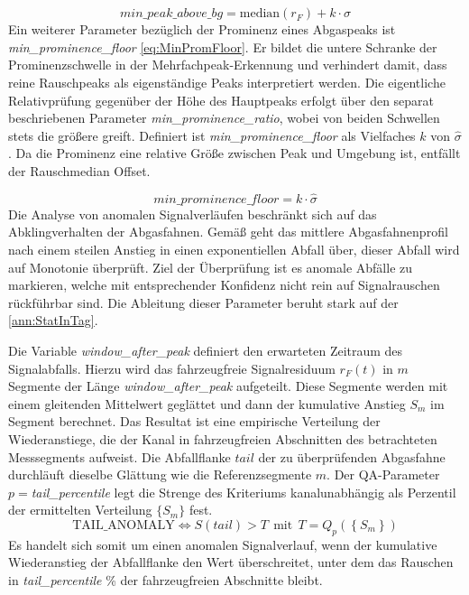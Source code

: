 \begin{equation}
min\_peak\_above\_bg = \mathrm{median}(r_F) + k \cdot \widehat{\sigma}
\label{eq:MinPeakAbovBg}
\end{equation}
\noindent
Ein weiterer Parameter bezüglich der Prominenz eines Abgaspeaks ist \textit{min\_prominence\_floor} \eqref{eq:MinPromFloor}. Er bildet die untere Schranke der Prominenzschwelle in der Mehrfachpeak-Erkennung und verhindert damit, dass reine Rauschpeaks als eigenständige Peaks interpretiert werden. Die eigentliche Relativprüfung gegenüber der Höhe des Hauptpeaks erfolgt über den separat beschriebenen Parameter \textit{min\_prominence\_ratio}, wobei von beiden Schwellen stets die größere greift. Definiert ist \textit{min\_prominence\_floor} als Vielfaches $k$ von $\widehat{\sigma}$. Da die Prominenz eine relative Größe zwischen Peak und Umgebung ist, entfällt der Rauschmedian Offset.

\begin{equation}
min\_prominence\_floor = k \cdot \widehat{\sigma}
\label{eq:MinPromFloor}
\end{equation}
\noindent
Die Analyse von anomalen Signalverläufen beschränkt sich auf das Abklingverhalten der Abgasfahnen. Gemäß \cite[S. 11700]{farrenHighlyDisaggregatedParticulate2025} geht das mittlere Abgasfahnenprofil nach einem steilen Anstieg in einen exponentiellen Abfall über, dieser Abfall wird auf Monotonie überprüft. Ziel der Überprüfung ist es anomale Abfälle zu markieren, welche mit entsprechender Konfidenz nicht rein auf Signalrauschen rückführbar sind. Die Ableitung dieser Parameter beruht stark auf der \autoref{ann:StatInTag}.


Die Variable \textit{window\_after\_peak} definiert den erwarteten Zeitraum des Signalabfalls. Hierzu wird das fahrzeugfreie Signalresiduum $r_F(t)$ in $m$ Segmente der Länge \textit{window\_after\_peak} aufgeteilt. Diese Segmente werden mit einem gleitenden Mittelwert \cite[vgl.][S. 567]{fahrmeirStatistikWegZur2024} geglättet und dann der kumulative Anstieg $S_m$ im Segment berechnet. Das Resultat ist eine empirische Verteilung der Wiederanstiege, die der Kanal in fahrzeugfreien Abschnitten des betrachteten Messsegments aufweist. Die Abfallflanke $tail$ der zu überprüfenden Abgasfahne durchläuft dieselbe Glättung wie die Referenzsegmente $m$. \vspace{1em}
\noindent
Der QA-Parameter $p=$\textit{tail\_percentile} legt die Strenge des Kriteriums kanalunabhängig als Perzentil der ermittelten Verteilung $\{S_m\}$ fest.
\begin{equation}
    \mathrm{TAIL\_ANOMALY} \iff S(tail) > T ~~ \mathrm{mit ~~} T = Q_p \left( \left\{ S_m \right\}  \right)
\end{equation}
Es handelt sich somit um einen anomalen Signalverlauf, wenn der kumulative Wiederanstieg der Abfallflanke den Wert überschreitet, unter dem das Rauschen in \textit{tail\_percentile} \% der fahrzeugfreien Abschnitte bleibt.
